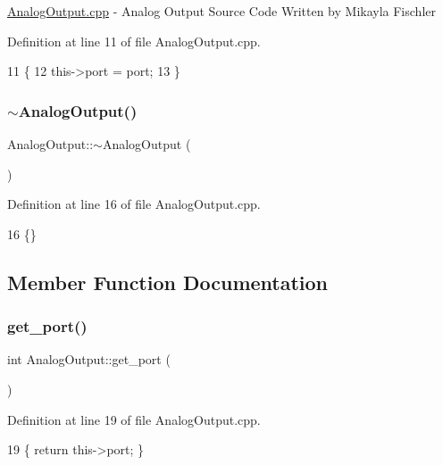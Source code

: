 \hyperlink{_analog_output_8cpp}{Analog\+Output.\+cpp} -\/ Analog Output Source Code Written by Mikayla Fischler 

Definition at line 11 of file Analog\+Output.\+cpp.


\begin{DoxyCode}
11                                    \{
12     this->port = port;
13 \}
\end{DoxyCode}
\mbox{\label{class_analog_output_a7848a6b7b7c15bba5c75f0f82f3c1d53}} 
\subsubsection{\texorpdfstring{$\sim$\+Analog\+Output()}{~AnalogOutput()}}
{\footnotesize\ttfamily Analog\+Output\+::$\sim$\+Analog\+Output (\begin{DoxyParamCaption}{ }\end{DoxyParamCaption})}



Definition at line 16 of file Analog\+Output.\+cpp.


\begin{DoxyCode}
16 \{\}
\end{DoxyCode}


\subsection{Member Function Documentation}
\mbox{\label{class_analog_output_a0a4146612660e06c9d2edfac9b51b6ef}} 
\subsubsection{\texorpdfstring{get\+\_\+port()}{get\_port()}}
{\footnotesize\ttfamily int Analog\+Output\+::get\+\_\+port (\begin{DoxyParamCaption}{ }\end{DoxyParamCaption})}



Definition at line 19 of file Analog\+Output.\+cpp.


\begin{DoxyCode}
19 \{ \textcolor{keywordflow}{return} this->port; \}
\end{DoxyCode}
\mbox{\label{class_analog_output_aa67e2c25c9377517a72346fc9402afad}} 
